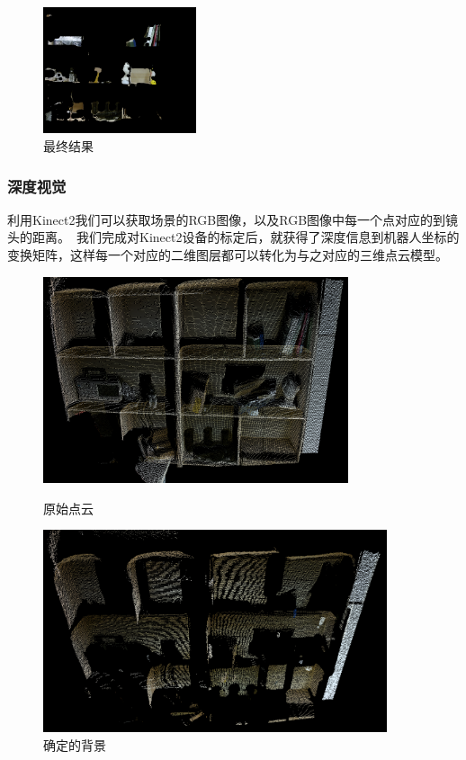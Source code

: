 \begin{figure}[H]
	\centering
    \includegraphics[width = 0.4\textwidth]{images/object.png}
    \caption{最终结果}
    \label{fig:object}
\end{figure}

\subsubsection{深度视觉}

利用Kinect2我们可以获取场景的RGB图像，以及RGB图像中每一个点对应的到镜头的距离。\ 我们完成对Kinect2设备的标定后，就获得了深度信息到机器人坐标的变换矩阵，这样每一个对应的二维图层都可以转化为与之对应的三维点云模型。\ 

\begin{figure}[H]
\begin{minipage}[t]{0.5\textwidth}
	\centering
    \includegraphics[width = 0.8\textwidth]{images/00.png}
    \caption{原始点云}
    \label{fig:initial_pc}
\end{minipage}
\begin{minipage}[t]{0.5\textwidth}
	\centering
    \includegraphics[width = 0.9\textwidth]{images/01.png}
    \caption{确定的背景}
    \label{fig:bg}
\end{minipage}
\end{figure}

